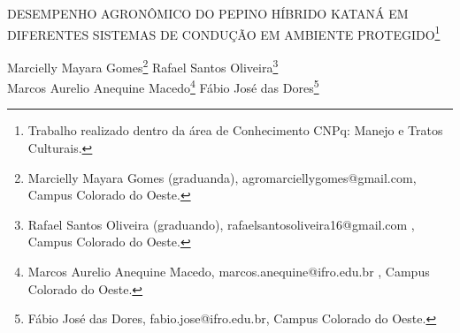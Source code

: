 \documentclass[article,12pt,onesidea,4paper,english,brazil]{abntex2}
\begin{document}
	
	
	\frenchspacing 
	
	\begin{center}
		\LARGE DESEMPENHO AGRONÔMICO DO PEPINO HÍBRIDO KATANÁ EM DIFERENTES
		SISTEMAS DE CONDUÇÃO EM AMBIENTE PROTEGIDO\footnote{Trabalho realizado dentro da área de Conhecimento CNPq: Manejo e Tratos Culturais.}
		
		\normalsize
	Marcielly Mayara Gomes\footnote{Marcielly Mayara Gomes (graduanda), agromarciellygomes@gmail.com, Campus Colorado do
		Oeste.} 
		Rafael Santos Oliveira\footnote{Rafael Santos Oliveira (graduando), rafaelsantosoliveira16@gmail.com , Campus Colorado do
			Oeste.} \\
		Marcos Aurelio Anequine Macedo\footnote{Marcos Aurelio Anequine Macedo, marcos.anequine@ifro.edu.br , Campus Colorado do Oeste.} 
		Fábio José das Dores\footnote{Fábio José das Dores, fabio.jose@ifro.edu.br, Campus Colorado do Oeste.} 
	\end{center}
	
\end{document}
